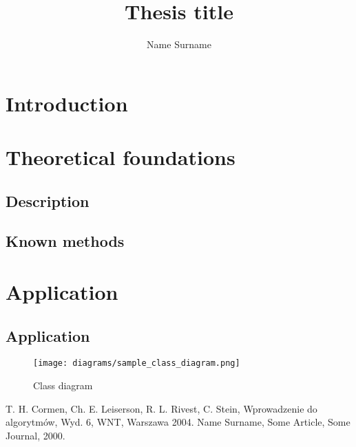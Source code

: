 \documentclass[english, bsc]{iithesis}
\title{Thesis title}
\author{Name Surname}
\begin{document}
    \maketitle

    \begin{abstract}
        \lipsum[2-4]
    \end{abstract}

    \clearpage
    \tableofcontents

    \listoffigures
    \clearpage

    \cleardoublepage


    \section{Introduction}


    \section{Theoretical foundations}

    \subsection{Description}

    \subsection{Known methods}


    \section{Application}

    \subsection{Application}

    \begin{figure}[H]
        \caption{Class diagram}
        \label{fig:class_diagram}
        \centering
        \texttt{[image: diagrams/sample\_class\_diagram.png]}
    \end{figure}

    \begin{thebibliography}{2}
        T. H. Cormen, Ch. E. Leiserson, R. L. Rivest, C. Stein,
        Wprowadzenie do algorytmów, Wyd. 6, WNT, Warszawa 2004.
        Name Surname, Some Article, Some Journal, 2000.
    \end{thebibliography}
\end{document}
